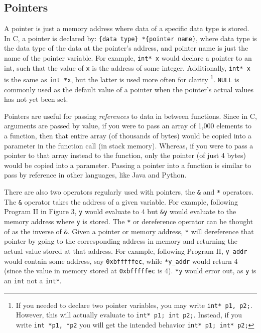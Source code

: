 \documentclass{article}
\begin{document}
\subsection{Pointers}
A pointer is just a memory address where data of a specific data type is stored. In C, a pointer is declared by: \texttt{\{data type\} *\{pointer name\}}, where data type is the data type of the data at the pointer's address, and pointer name is just the name of the pointer variable. For example, \texttt{int* x} would declare a pointer to an int, such that the value of \texttt{x} is the address of some integer. Additionally, \texttt{int* x} is the same as \texttt{int *x}, but the latter is used more often for clarity \footnote{If you needed to declare two pointer variables, you may write \texttt{int* p1, p2;}. However, this will actually evaluate to \texttt{int* p1; int p2;}. Instead, if you write \texttt{int *p1, *p2} you will get the intended behavior \texttt{int* p1; int* p2;}}. \texttt{NULL} is commonly used as the default value of a pointer when the pointer's actual values has not yet been set.

Pointers are useful for passing \textit{references} to data in between functions. Since in C, arguments are passed by value, if you were to pass an array of 1,000 elements to a function, then that entire array (of thousands of bytes) would be copied into a parameter in the function call (in stack memory). Whereas, if you were to pass a pointer to that array instead to the function, only the pointer (of just 4 bytes) would be copied into a parameter. Passing a pointer into a function is similar to pass by reference in other languages, like Java and Python.

There are also two operators regularly used with pointers, the \texttt{\&} and \texttt{*} operators. The \texttt{\&} operator takes the address of a given variable. For example, following Program II in Figure 3, \texttt{y} would evaluate to 4 but \texttt{\&y} would evaluate to the memory address where \texttt{y} is stored. The \texttt{*} or dereference operator can be thought of as the inverse of \texttt{\&}. Given a pointer or memory address, \texttt{*} will dereference that pointer by going to the corresponding address in memory and returning the actual value stored at that address. For example, following Program II, \texttt{y\_addr} would contain some address, say \texttt{0xbfffffec}, while \texttt{*y\_addr} would return 4 (since the value in memory stored at \texttt{0xbfffffec} is 4). \texttt{*y} would error out, as \texttt{y} is an \texttt{int} not a \texttt{int*}.
\end{document}
